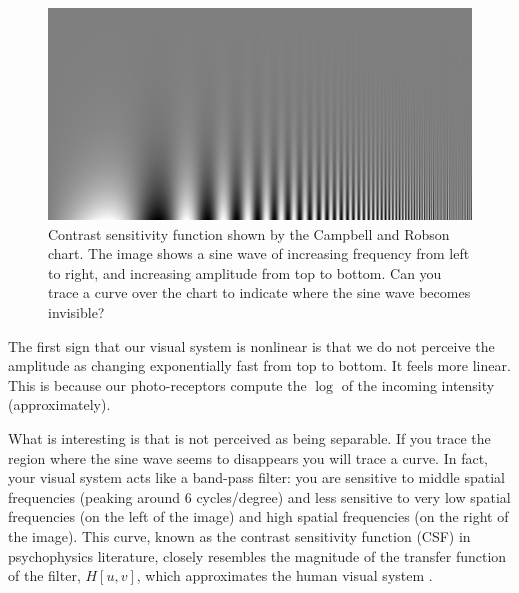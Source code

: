 \begin{figure}[t]
\centerline{
\includegraphics[width=1\linewidth]{figures/spatial_filters/csf.jpg}
} 
\caption{Contrast sensitivity function shown by the Campbell and Robson chart. The image shows a sine wave of increasing frequency from left to right, and increasing amplitude from top to bottom. Can you trace a curve over the chart to indicate where the sine wave becomes invisible?} 
\label{fig:csfchart}
\end{figure}


The first sign that our visual system is nonlinear is that we do not perceive the amplitude as changing exponentially fast from top to bottom. It feels more linear. This is because our photo-receptors compute the $\log$ of the incoming intensity (approximately).

What is interesting is that \fig{\ref{fig:csfchart}} is not perceived as being separable. If you trace the region where the sine wave seems to disappears you will trace a curve. 
In fact, your visual system acts like a band-pass filter: you are sensitive to middle spatial frequencies (peaking around 6 cycles/degree) and less sensitive to very low spatial frequencies (on the left of the image) and high spatial frequencies (on the right of the image).
This curve, known as the contrast sensitivity function (CSF)
in psychophysics literature, closely resembles the magnitude of the transfer function of the filter, $H \left[ u,v \right]$, which approximates the human visual system \cite{de1988spatial}.


